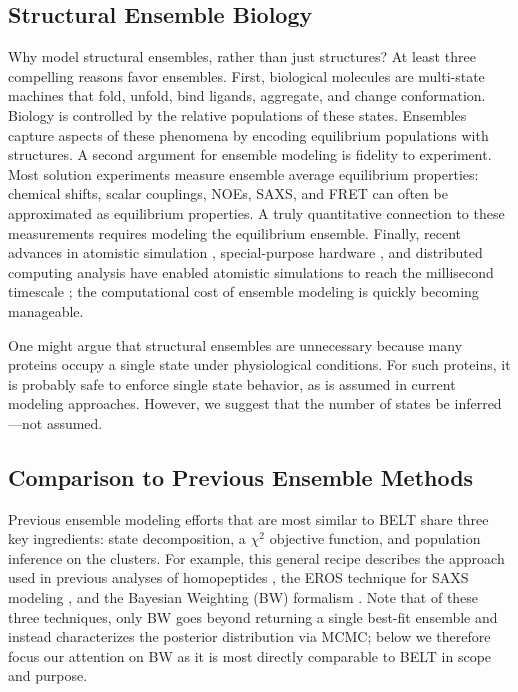 \documentclass[12pt]{article}
\begin{document}
\subsection*{Structural Ensemble Biology}

Why model structural ensembles, rather than just structures?  At least three compelling reasons favor ensembles.  First, biological molecules are multi-state machines that fold, unfold, bind ligands, aggregate, and change conformation.  Biology is controlled by the relative populations of these states.  Ensembles capture aspects of these phenomena by encoding equilibrium populations with structures.  A second argument for ensemble modeling is fidelity to experiment.  Most solution experiments measure ensemble average equilibrium properties: chemical shifts, scalar couplings, NOEs, SAXS, and FRET can often be approximated as equilibrium properties.  A truly quantitative connection to these measurements requires modeling the equilibrium ensemble.  Finally, recent advances in atomistic simulation  \cite{hess2008, pronk2013gromacs, eastman2012openmm, eastman2010openmm}, special-purpose hardware  \cite{Shaw2008}, and distributed computing analysis  \cite{emma, msmb2} have enabled atomistic simulations to 
reach the millisecond timescale  \cite{voelz2010, bowman2011atomistic, shaw2010, Shaw2011}; the computational cost of ensemble modeling is quickly becoming manageable.

One might argue that structural ensembles are unnecessary because many proteins occupy a single state under physiological conditions.  For such proteins, it is probably safe to enforce single state behavior, as is assumed in current modeling approaches. However, we suggest that the number of states be inferred---not assumed.  

\subsection*{Comparison to Previous Ensemble Methods}

Previous ensemble modeling efforts that are most similar to BELT share three key ingredients: state decomposition, a $\chi^2$ objective function, and population inference on the clusters.  For example, this general recipe describes the approach used in previous analyses of homopeptides  \cite{Graf2007}, the EROS technique for SAXS modeling  \cite{rozycki2011saxs}, and the Bayesian Weighting (BW) formalism  \cite{fisher2010, fisher2012efficient}.  Note that of these three techniques, only BW goes beyond returning a single best-fit ensemble and instead characterizes the posterior distribution via MCMC; below we therefore focus our attention on BW as it is most directly comparable to BELT in scope and purpose.
\end{document}
